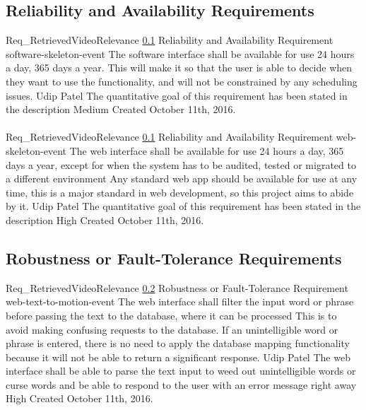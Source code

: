 \documentclass{scrreprt}
\begin{document}
\subsection{Reliability and Availability Requirements}
\label{req-reliability-availability}
\requirement
{Req_RetrievedVideoRelevance}
{\ref{req-reliability-availability} Reliability and Availability Requirement}
{software-skeleton-event}
{The software interface shall be available for use 24 hours a day, 365 days a year.}
{This will make it so that the user is able to decide when they want to use the functionality, and will not be constrained by any scheduling issues.}
{Udip Patel}
{The quantitative goal of this requirement has been stated in the description}
{Medium}
{Created October 11th, 2016.}
\\ \\

\requirement
{Req_RetrievedVideoRelevance}
{\ref{req-reliability-availability} Reliability and Availability Requirement}
{web-skeleton-event}
{The web interface shall be available for use 24 hours a day, 365 days a year, except for when the system has to be audited, tested or migrated to a different environment}
{Any standard web app should be available for use at any time, this is a major standard in web development, so this project aims to abide by it.}
{Udip Patel}
{The quantitative goal of this requirement has been stated in the description}
{High}
{Created October 11th, 2016.}

\subsection{Robustness or Fault-Tolerance Requirements}

\label{req-robustness}

\requirement
{Req_RetrievedVideoRelevance}
{\ref{req-robustness} Robustness or Fault-Tolerance Requirement}
{web-text-to-motion-event}
{The web interface shall filter the input word or phrase before passing the text to the database, where it can be processed}
{This is to avoid making confusing requests to the database. If an unintelligible word or phrase is entered, there is no need to apply the database mapping functionality because it will not be able to return a significant response.}
{Udip Patel}
{The web interface shall be able to parse the text input to weed out unintelligible words or curse words and be able to respond to the user with an error message right away }
{High}
{Created October 11th, 2016.}
\end{document}
